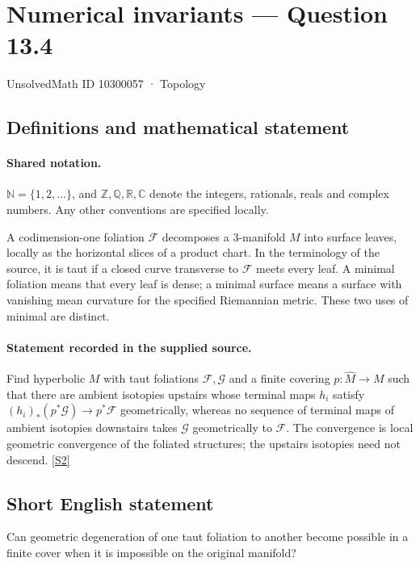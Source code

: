 \documentclass[11pt]{article}
\newcommand{\sref}[2]{\hyperlink{source:#1:#2}{[S#2]}}
\begin{document}
\setcounter{section}{10300056}
\section{Numerical invariants — Question 13.4}\label{10300057}
{\small\sffamily UnsolvedMath ID 10300057 · Topology}
\subsection{Definitions and mathematical statement}

\paragraph{Shared notation.}$\mathbb N=\{1,2,\ldots\}$, and $\mathbb Z,\mathbb Q,\mathbb R,\mathbb C$ denote the integers, rationals, reals and complex numbers. Any other conventions are specified locally.


A codimension-one foliation $\mathcal F$ decomposes a $3$-manifold $M$ into surface leaves, locally as the horizontal slices of a product chart. In the terminology of the source, it is taut if a closed curve transverse to $\mathcal F$ meets every leaf. A minimal foliation means that every leaf is dense; a minimal surface means a surface with vanishing mean curvature for the specified Riemannian metric. These two uses of minimal are distinct.
\paragraph{Statement recorded in the supplied source.}
Find hyperbolic $M$ with taut foliations $\mathcal F,\mathcal G$ and a finite covering $p:\widehat M\to M$ such that there are ambient isotopies upstairs whose terminal maps $h_i$ satisfy $(h_i)_*(p^*\mathcal G)\to p^*\mathcal F$ geometrically, whereas no sequence of terminal maps of ambient isotopies downstairs takes $\mathcal G$ geometrically to $\mathcal F$. The convergence is local geometric convergence of the foliated structures; the upstairs isotopies need not descend. \sref{10300057}{2}
\subsection{Short English statement}
Can geometric degeneration of one taut foliation to another become possible in a finite cover when it is impossible on the original manifold?
\end{document}
